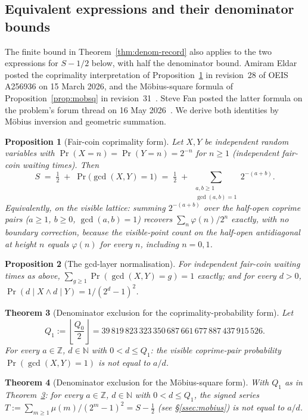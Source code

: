 \documentclass[11pt]{article}
\theoremstyle{plain}
\newtheorem{thm}{Theorem}[section]
\newtheorem{prop}[thm]{Proposition}
\theoremstyle{definition}
\theoremstyle{remark}
\begin{document}
\subsection{Equivalent expressions and their denominator bounds}
\label{ssec:coprime}

The finite bound in Theorem~\ref{thm:denom-record} also applies to the
two expressions for $S-1/2$ below, with half the denominator bound.
Amiram Eldar posted the coprimality interpretation of
Proposition~\ref{prop:coprime} in revision~28 of OEIS A256936 on
15 March 2026, and the M\"obius-square formula of
Proposition~\ref{prop:mobsq} in revision~31~\cite{eldar2026oeis}.
Steve Fan posted the latter formula on the problem's forum thread on
16 May 2026~\cite{fan2026totient}. We derive both identities by
M\"obius inversion and geometric summation.

\begin{prop}[Fair-coin coprimality form]
\label{prop:coprime}
Let $X,Y$ be independent random variables with $\Pr(X=n)=\Pr(Y=n)=2^{-n}$
for $n \ge 1$ (independent fair-coin waiting times). Then
\[
S \;=\; \tfrac12 \;+\; \Pr\bigl(\gcd(X,Y)=1\bigr)
\;=\; \tfrac12 \;+\; \sum_{\substack{a,b\ge 1\\ \gcd(a,b)=1}} 2^{-(a+b)}.
\]
Equivalently, on the visible lattice: summing $2^{-(a+b)}$ over the half-open
coprime pairs ($a\ge1$, $b\ge0$, $\gcd(a,b)=1$) recovers $\sum_n \varphi(n)/2^n$
exactly, with no boundary correction, because the visible-point count on the
half-open antidiagonal at height $n$ equals $\varphi(n)$ for every $n$,
including $n=0,1$.
\end{prop}

\begin{prop}[The gcd-layer normalisation]
\label{prop:gcdlayer}
For independent fair-coin waiting times as above, $\sum_{g\ge1}\Pr(\gcd(X,Y)=g)=1$
exactly; and for every $d>0$, $\Pr(d\mid X \wedge d\mid Y) = 1/(2^d-1)^2$.
\end{prop}

\begin{thm}[Denominator exclusion for the coprimality-probability form]
\label{thm:denomcoprime}
Let
\[
Q_1 := \left\lfloor \frac{Q_0}{2} \right\rfloor = 39\,819\,823\,323\,350\,687\,661\,677\,887\,437\,915\,526.
\]
For every $a\in\mathbb{Z}$, $d\in\mathbb{N}$ with $0<d\le Q_1$: the visible
coprime-pair probability $\Pr(\gcd(X,Y)=1)$ is not equal to $a/d$.
\end{thm}

\begin{thm}[Denominator exclusion for the M\"obius-square form]
\label{thm:denommobsq}
With $Q_1$ as in Theorem~\ref{thm:denomcoprime}: for every $a\in\mathbb{Z}$,
$d\in\mathbb{N}$ with $0<d\le Q_1$, the signed series
$T := \sum_{m\ge1} \mu(m)/(2^m-1)^2 = S - \tfrac12$ (see \S\ref{ssec:mobius})
is not equal to $a/d$.
\end{thm}
\end{document}
